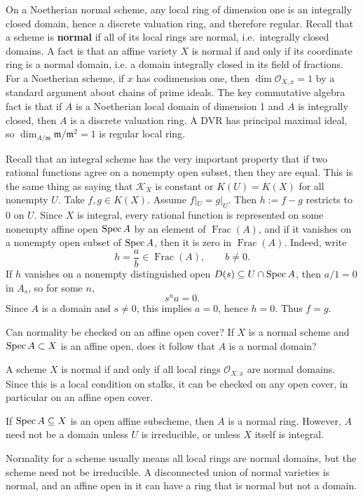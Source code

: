 \documentclass[12pt]{article}
\begin{document}
On a Noetherian normal scheme, any local ring of dimension one is an integrally closed domain, hence a discrete valuation ring, and therefore regular. Recall that a scheme is \textbf{normal} if all of its local rings are normal, i.e.\ integrally closed domains. A fact is that an affine variety $X$ is normal if and only if its coordinate ring is a normal domain, i.e. a domain integrally closed in its field of fractions. For a Noetherian scheme, if $x$ has codimension one, then $\dim \mathcal O_{X,x}=1$ by a standard argument about chains of prime ideals. The key commutative algebra fact is that if $A$ is a Noetherian local domain of dimension 1 and $A$ is integrally closed, then $A$ is a discrete valuation ring. A DVR has principal maximal ideal, so $\dim_{A/\mathfrak m}\mathfrak m/\mathfrak m^2=1$ is regular local ring.


Recall that an integral scheme has the very important property that if two rational functions agree on a nonempty open subset, then they are equal. This is the same thing as saying that $\mathcal{K}_X$ is constant or $K(U) = K(X)$ for all nonempty $U$. Take $f, g \in K(X)$. Assume $f|_U = g|_U$. Then $h := f - g$ restricts to $0$ on $U$. Since $X$ is integral, every rational function is represented on some nonempty affine open $\operatorname{Spec} A$ by an element of $\operatorname{Frac}(A)$, and if it vanishes on a nonempty open subset of $\operatorname{Spec} A$, then it is zero in $\operatorname{Frac}(A)$. Indeed, write
\[
    h = \frac{a}{b} \in \operatorname{Frac}(A), \qquad b \neq 0.
\]
If $h$ vanishes on a nonempty distinguished open $D(s) \subseteq U \cap \operatorname{Spec} A$, then $a/1 = 0$ in $A_s$, so for some $n$,
\[
    s^n a = 0.
\]
Since $A$ is a domain and $s \neq 0$, this implies $a = 0$, hence $h = 0$. Thus $f = g$.

\begin{exercise}
    Can normality be checked on an affine open cover? If $X$ is a normal scheme and $\operatorname{Spec} A \subset X$ is an affine open, does it follow that $A$ is a normal domain?
\end{exercise}
\begin{solution}
    A scheme $X$ is normal if and only if all local rings $\mathcal{O}_{X,x}$ are normal domains. Since this is a local condition on stalks, it can be checked on any open cover, in particular on an affine open cover.

    If $\operatorname{Spec} A \subseteq X$ is an open affine subscheme, then $A$ is a normal ring. However, $A$ need not be a domain unless $U$ is irreducible, or unless $X$ itself is integral.

    Normality for a scheme usually means all local rings are normal domains, but the scheme need not be irreducible. A disconnected union of normal varieties is normal, and an affine open in it can have a ring that is normal but not a domain.
\end{solution}
\end{document}
